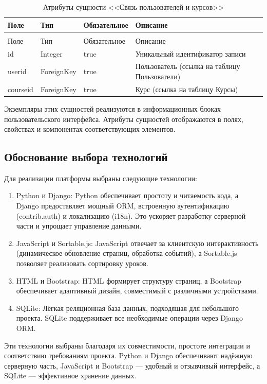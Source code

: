 \begin{xltabular}{\textwidth}{|l|l|p{3.2cm}|X|}
	\caption{Атрибуты сущности <<Связь пользователей и курсов>>\label{user_courses:table}}\\ \hline
	Поле & Тип & Обязательное & Описание \\ \hline
	\endfirsthead
	\\ \hline
	Поле & Тип & Обязательное & Описание \\ \hline
	\endhead
	id & Integer & true & Уникальный идентификатор записи \\ \hline
	userid & ForeignKey & true & Пользователь (ссылка на таблицу Пользователи) \\ \hline
	courseid & ForeignKey & true & Курс (ссылка на таблицу Курсы) \\ \hline
\end{xltabular}

Экземпляры этих сущностей реализуются в информационных блоках пользовательского интерфейса. Атрибуты сущностей отображаются в полях, свойствах и компонентах соответствующих элементов.

\subsection{Обоснование выбора технологий}

Для реализации платформы выбраны следующие технологии:
\begin{enumerate}
	\item {Python и Django}: Python обеспечивает простоту и читаемость кода, а Django предоставляет мощный ORM, встроенную аутентификацию (contrib.auth) и локализацию (i18n). Это ускоряет разработку серверной части и упрощает управление данными.
	\item {JavaScript и Sortable.js}: JavaScript отвечает за клиентскую интерактивность (динамическое обновление страниц, обработка событий), а Sortable.js позволяет реализовать сортировку уроков.
	\item {HTML и Bootstrap}: HTML формирует структуру страниц, а Bootstrap обеспечивает адаптивный дизайн, совместимый с различными устройствами.
	\item {SQLite}: Лёгкая реляционная база данных, подходящая для небольшого проекта. SQLite поддерживает все необходимые операции через Django ORM.
\end{enumerate}

Эти технологии выбраны благодаря их совместимости, простоте интеграции и соответствию требованиям проекта. Python и Django обеспечивают надёжную серверную часть, JavaScript и Bootstrap — удобный и отзывчивый интерфейс, а SQLite — эффективное хранение данных.



